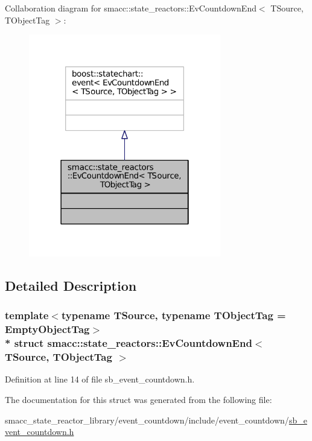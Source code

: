 Collaboration diagram for smacc\+:\+:state\+\_\+reactors\+:\+:Ev\+Countdown\+End$<$ T\+Source, T\+Object\+Tag $>$\+:
\nopagebreak
\begin{figure}[H]
\begin{center}
\leavevmode
\includegraphics[width=238pt]{structsmacc_1_1state__reactors_1_1EvCountdownEnd__coll__graph}
\end{center}
\end{figure}


\subsection{Detailed Description}
\subsubsection*{template$<$typename T\+Source, typename T\+Object\+Tag = Empty\+Object\+Tag$>$\\*
struct smacc\+::state\+\_\+reactors\+::\+Ev\+Countdown\+End$<$ T\+Source, T\+Object\+Tag $>$}



Definition at line 14 of file sb\+\_\+event\+\_\+countdown.\+h.



The documentation for this struct was generated from the following file\+:\begin{DoxyCompactItemize}
\item 
smacc\+\_\+state\+\_\+reactor\+\_\+library/event\+\_\+countdown/include/event\+\_\+countdown/\hyperlink{sb__event__countdown_8h}{sb\+\_\+event\+\_\+countdown.\+h}\end{DoxyCompactItemize}
